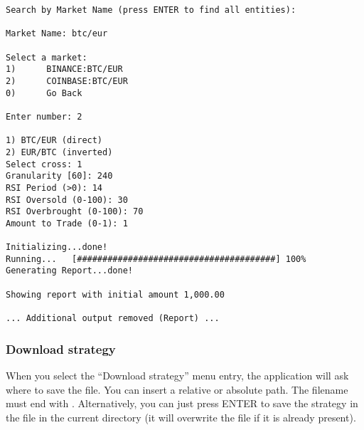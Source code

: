 \begin{verbatim}
Search by Market Name (press ENTER to find all entities):

Market Name: btc/eur

Select a market: 
1)      BINANCE:BTC/EUR
2)      COINBASE:BTC/EUR
0)      Go Back

Enter number: 2

1) BTC/EUR (direct)
2) EUR/BTC (inverted)
Select cross: 1
Granularity [60]: 240
RSI Period (>0): 14
RSI Oversold (0-100): 30
RSI Overbrought (0-100): 70
Amount to Trade (0-1): 1

Initializing...done!
Running...   [#######################################] 100%
Generating Report...done!

Showing report with initial amount 1,000.00

... Additional output removed (Report) ...
\end{verbatim}

\subsubsection{Download strategy}

When you select the ``Download strategy'' menu entry, the application will ask
where to save the file. You can insert a relative or absolute path. The filename
must end with . Alternatively, you can just press ENTER to save the
strategy in the  file in the current directory (it will
overwrite the file if it is already present).
